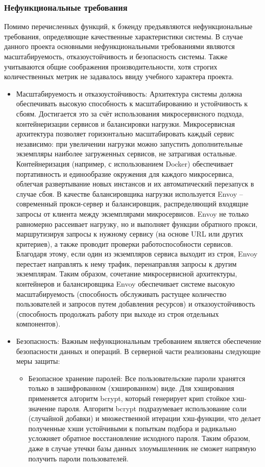 \subsubsection*{Нефункциональные требования}
Помимо перечисленных функций, к бэкенду предъявляются нефункциональные требования, определяющие качественные характеристики системы. В случае данного проекта основными нефункциональными требованиями являются масштабируемость, отказоустойчивость и безопасность системы. Также учитываются общие соображения производительности, хотя строгих количественных метрик не задавалось ввиду учебного характера проекта.
\begin{itemize}
    \item Масштабируемость и отказоустойчивость: Архитектура системы должна обеспечивать высокую способность к масштабированию и устойчивость к сбоям. Достигается это за счёт использования микросервисного подхода, контейнеризации сервисов и балансировки нагрузки. Микросервисная архитектура позволяет горизонтально масштабировать каждый сервис независимо: при увеличении нагрузки можно запустить дополнительные экземпляры наиболее загруженных сервисов, не затрагивая остальные. Контейнеризация (например, с использованием Docker) обеспечивает портативность и единообразие окружения для каждого микросервиса, облегчая развертывание новых инстансов и их автоматический перезапуск в случае сбоя. В качестве балансировщика нагрузки используется Envoy – современный прокси-сервер и балансировщик, распределяющий входящие запросы от клиента между экземплярами микросервисов. Envoy не только равномерно рассеивает нагрузку, но и выполняет функции обратного прокси, маршрутизируя запросы к нужному сервису (на основе URL или других критериев), а также проводит проверки работоспособности сервисов. Благодаря этому, если один из экземпляров сервиса выходит из строя, Envoy перестает направлять к нему трафик, перенаправляя запросы к другим экземплярам. Таким образом, сочетание микросервисной архитектуры, контейнеров и балансировщика Envoy обеспечивает системе высокую масштабируемость (способность обслуживать растущее количество пользователей и запросов путем добавления ресурсов) и отказоустойчивость (способность продолжать работу при выходе из строя отдельных компонентов).
    \item Безопасность: Важным нефункциональным требованием является обеспечение безопасности данных и операций. В серверной части реализованы следующие меры защиты:
    \begin{itemize}
        \item Безопасное хранение паролей: Все пользовательские пароли хранятся только в зашифрованном (хэшированном) виде. Для хэширования применяется алгоритм bcrypt, который генерирует крип стойкое хэш-значение пароля. Алгоритм bcrypt подразумевает использование соли (случайной добавки) и множественной итерации хэш-функции, что делает полученные хэши устойчивыми к попыткам подбора и радикально усложняет обратное восстановление исходного пароля. Таким образом, даже в случае утечки базы данных злоумышленник не сможет напрямую получить пароли пользователей.

\end{itemize}
\end{itemize}
